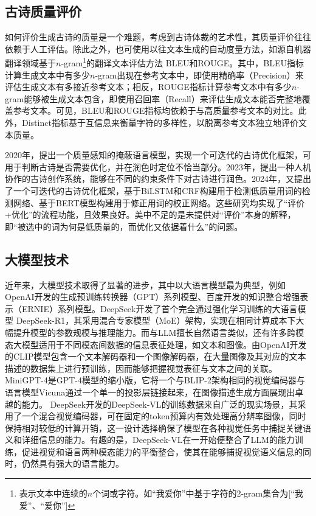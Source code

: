 \subsection{古诗质量评价}
如何评价生成古诗的质量是一个难题，考虑到古诗体裁的艺术性，其质量评价往往依赖于人工评估。除此之外，也可使用以往文本生成的自动度量方法，如源自机器翻译领域基于$n$-gram\footnote{表示文本中连续的$n$个词或字符。如“我爱你”中基于字符的$2$-gram集合为[“我爱”、“爱你”]}的翻译文本评估方法
BLEU\cite{papineniBLEUMethodAutomatic2002}和ROUGE\cite{linROUGEPackageAutomatic2004}。其中，BLEU指标计算生成文本中有多少$n$-gram出现在参考文本中，即使用精确率（Precision）来评估生成文本有多接近参考文本；相反，ROUGE指标计算参考文本中有多少$n$-gram能够被生成文本包含，即使用召回率（Recall）来评估生成文本能否完整地覆盖参考文本。可见，BLEU和ROUGE指标均依赖于与高质量参考文本的对比。此外，Distinct指标基于互信息来衡量字符的多样性，以脱离参考文本独立地评价文本质量。\cite{liDiversityPromotingObjectiveFunction2016}

2020年，\cite{dengIterativePolishingFramework2020}提出一个质量感知的掩蔽语言模型，实现一个可迭代的古诗优化框架，可用于判断古诗是否需要优化，并在润色时定位不恰当部分。2023年，\cite{maYuShengHumaninLoop2023}提出一种人机协作的古诗创作系统，能够在不同的约束条件下对古诗进行润色。2024年，\cite{chenPolishingModelMachineGenerated2024}又提出了一个可迭代的古诗优化框架，基于BiLSTM和CRF构建用于检测低质量用词的检测网络、基于BERT模型构建用于修正用词的校正网络。这些研究均实现了“评价+优化”的流程功能，且效果良好。美中不足的是未提供对“评价”本身的解释，即“被选中的词为何是低质量的，而优化又依据着什么”的问题。

\subsection{大模型技术}
近年来，大模型技术取得了显著的进步，其中以大语言模型最为典型，例如OpenAI开发的生成预训练转换器（GPT）系列模型、百度开发的知识整合增强表示（ERNIE）系列模型\cite{zhangERNIEEnhancedLanguage2019}。DeepSeek开发了首个完全通过强化学习训练的大语言模型 DeepSeek-R1\cite{deepseek-aiDeepSeekR1IncentivizingReasoning2025}，其采用混合专家模型（MoE）架构，实现在相同计算成本下大幅提升模型的参数规模与推理能力。而与LLM擅长自然语言类似，还有许多跨模态大模型适用于不同模态间数据的信息表征处理，如文本和图像。由OpenAI开发的CLIP模型\cite{radfordLearningTransferableVisual2021}包含一个文本解码器和一个图像解码器，在大量图像及其对应的文本描述的数据集上进行预训练，因而能够把握视觉表征与文本之间的关联。MiniGPT-4\cite{zhuMiniGPT4EnhancingVisionLanguage2023}是GPT-4模型的缩小版，它将一个与BLIP-2架构相同的视觉编码器与语言模型Vicuna通过一个单一的投影层链接起来，在图像描述生成方面展现出卓越的能力。
DeepSeek开发的DeepSeek-VL\cite{luDeepSeekVLRealWorldVisionLanguage2024}的训练数据来自广泛的现实场景，其采用了一个混合视觉编码器，可在固定的token预算内有效处理高分辨率图像，同时保持相对较低的计算开销，这一设计选择确保了模型在各种视觉任务中捕捉关键语义和详细信息的能力。有趣的是，DeepSeek-VL在一开始便整合了LLM的能力训练，促进视觉和语言两种模态能力的平衡整合，使其在能够捕捉视觉语义信息的同时，仍然具有强大的语言能力。

